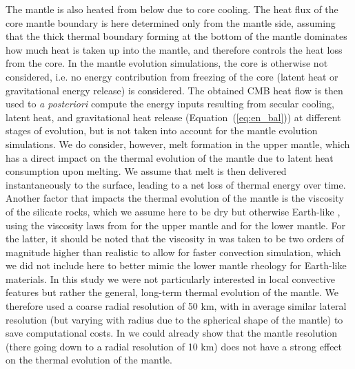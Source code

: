 \documentclass[draft]{agujournal2019} %
\begin{document}
The mantle is also heated from below due to core cooling. The heat flux of the core mantle boundary is here determined only from the mantle side, assuming that the thick thermal boundary forming at the bottom of the mantle dominates how much heat is taken up into the mantle, and therefore controls the heat loss from the core. In the mantle evolution simulations, the core is otherwise not considered, i.e. no energy contribution from freezing of the core (latent heat or gravitational energy release) is considered.
The obtained CMB heat flow is then used to \textit{a posteriori} compute the energy inputs resulting from secular cooling, latent heat, and gravitational heat release (Equation~(\ref{eq:en_bal})) at different stages of evolution, but is not taken into account for the mantle evolution simulations. We do consider, however, melt formation in the upper mantle, which has a direct impact on the thermal evolution of the mantle due to latent heat consumption upon melting. We assume that melt is then delivered instantaneously to the surface, leading to a net loss of thermal energy over time. Another factor that impacts the thermal evolution of the mantle is the viscosity of the silicate rocks, which we assume here to be dry but otherwise Earth-like \cite{NOACK201740}, using the viscosity laws from  for the upper mantle and  for the lower mantle. For the latter, it should be noted that the viscosity in  was taken to be two orders of magnitude higher than realistic to allow for faster convection simulation, which we did not include here to better mimic the lower mantle rheology for Earth-like materials. 
In this study we were not particularly interested in local convective features but rather the general, long-term thermal evolution of the mantle. We therefore used a coarse radial resolution of 50 km, with in average similar lateral resolution (but varying with radius due to the spherical shape of the mantle) to save computational costs. In  we could already show that the mantle resolution (there going down to a radial resolution of 10 km) does not have a strong effect on the thermal evolution of the mantle.
\end{document}
